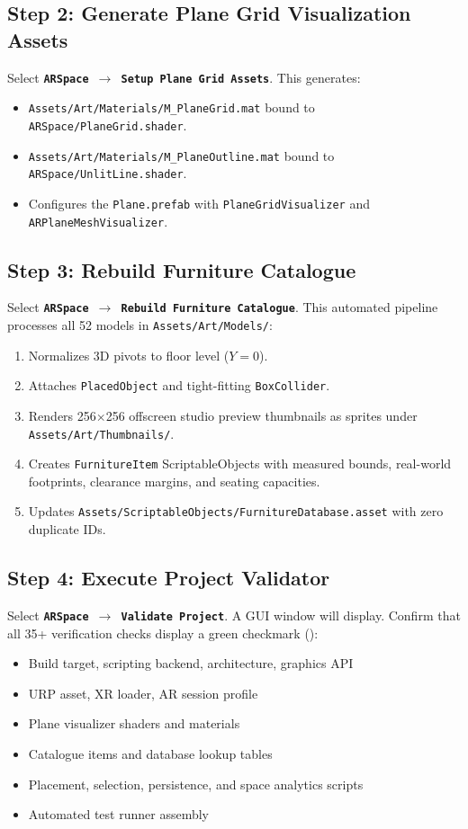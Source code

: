 \documentclass[11pt,a4paper]{article}
\begin{document}
\subsection{Step 2: Generate Plane Grid Visualization Assets}
Select \textbf{\texttt{ARSpace $\rightarrow$ Setup Plane Grid Assets}}.
This generates:
\begin{itemize}[noitemsep]
    \item \texttt{Assets/Art/Materials/M\_PlaneGrid.mat} bound to \texttt{ARSpace/PlaneGrid.shader}.
    \item \texttt{Assets/Art/Materials/M\_PlaneOutline.mat} bound to \texttt{ARSpace/UnlitLine.shader}.
    \item Configures the \texttt{Plane.prefab} with \texttt{PlaneGridVisualizer} and \texttt{ARPlaneMeshVisualizer}.
\end{itemize}

\subsection{Step 3: Rebuild Furniture Catalogue}
Select \textbf{\texttt{ARSpace $\rightarrow$ Rebuild Furniture Catalogue}}.
This automated pipeline processes all 52 models in \texttt{Assets/Art/Models/}:
\begin{enumerate}[noitemsep]
    \item Normalizes 3D pivots to floor level ($Y = 0$).
    \item Attaches \texttt{PlacedObject} and tight-fitting \texttt{BoxCollider}.
    \item Renders 256$\times$256 offscreen studio preview thumbnails as sprites under \texttt{Assets/Art/Thumbnails/}.
    \item Creates \texttt{FurnitureItem} ScriptableObjects with measured bounds, real-world footprints, clearance margins, and seating capacities.
    \item Updates \texttt{Assets/ScriptableObjects/FurnitureDatabase.asset} with zero duplicate IDs.
\end{enumerate}

\subsection{Step 4: Execute Project Validator}
Select \textbf{\texttt{ARSpace $\rightarrow$ Validate Project}}.
A GUI window will display. Confirm that all 35+ verification checks display a green checkmark (\textcolor{successgreen}{\textbf{\checkmark}}):
\begin{itemize}[noitemsep]
    \item Build target, scripting backend, architecture, graphics API
    \item URP asset, XR loader, AR session profile
    \item Plane visualizer shaders and materials
    \item Catalogue items and database lookup tables
    \item Placement, selection, persistence, and space analytics scripts
    \item Automated test runner assembly
\end{itemize}
\end{document}

